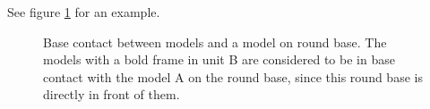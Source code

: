 See figure \ref{figure/round_base} for an example.

\begin{figure}[!htbp]
	\begin{minipage}{0.27\textwidth}
	\def\svgwidth{\textwidth}
	
	\end{minipage}\hfill\begin{minipage}{0.7\textwidth}
	\caption{Base contact between models and a model on round base.\captionpar
	The models with a bold frame in unit B are considered to be in base contact with the model A on the round base, since this round base is directly in front of them.%
	}
	\label{figure/round_base}
	\end{minipage}
\end{figure}

